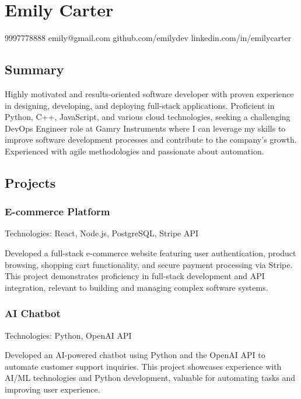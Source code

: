 \documentclass[
]{article}
\author{}
\date{}
\begin{document}
\section{Emily Carter}\label{emily-carter}

9997778888 \textbar{} emily@gmail.com \textbar{} github.com/emilydev
\textbar{} linkedin.com/in/emilycarter

\subsection{\texorpdfstring{\textbf{Summary}}{Summary}}\label{summary}

Highly motivated and results-oriented software developer with proven
experience in designing, developing, and deploying full-stack
applications. Proficient in Python, C++, JavaScript, and various cloud
technologies, seeking a challenging DevOps Engineer role at Gamry
Instruments where I can leverage my skills to improve software
development processes and contribute to the company's growth.
Experienced with agile methodologies and passionate about automation.

\subsection{\texorpdfstring{\textbf{Projects}}{Projects}}\label{projects}

\subsubsection{\texorpdfstring{\textbf{E-commerce
Platform}}{E-commerce Platform}}\label{e-commerce-platform}

Technologies: React, Node.js, PostgreSQL, Stripe API

Developed a full-stack e-commerce website featuring user authentication,
product browsing, shopping cart functionality, and secure payment
processing via Stripe. This project demonstrates proficiency in
full-stack development and API integration, relevant to building and
managing complex software systems.

\subsubsection{\texorpdfstring{\textbf{AI
Chatbot}}{AI Chatbot}}\label{ai-chatbot}

Technologies: Python, OpenAI API

Developed an AI-powered chatbot using Python and the OpenAI API to
automate customer support inquiries. This project showcases experience
with AI/ML technologies and Python development, valuable for automating
tasks and improving user experience.
\end{document}
